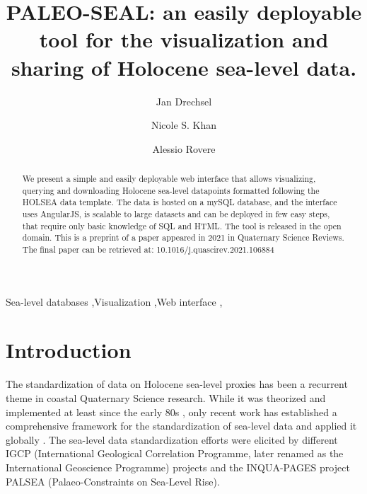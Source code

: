 \documentclass[a4paper,fleqn]{cas-dc}
\begin{document}
\let\WriteBookmarks\relax
\def\floatpagepagefraction{1}
\def\textpagefraction{.001}

\title [mode = title]{PALEO-SEAL: an easily deployable tool for the visualization and sharing of Holocene sea-level data.}                      

\author[1]{Jan Drechsel}
\address[1]{MARUM, Center for Marine Environmental Sciences, University of Bremen, Germany}

\author[2]{Nicole S. Khan}
\address[2]{Department of Earth Sciences and Swire Institute of Marine Science, University of Hong Kong, Hong Kong}

\author[1]{Alessio Rovere}
\cormark[1]

\begin{abstract}
We present a simple and easily deployable web interface that allows visualizing, querying and downloading Holocene sea-level datapoints formatted following the HOLSEA data template. The data is hosted on a mySQL database, and the interface uses AngularJS, is scalable to large datasets and can be deployed in few easy steps, that require only basic knowledge of SQL and HTML. The tool is released in the open domain. This is a preprint of a paper appeared in 2021 in Quaternary Science Reviews. The final paper can be retrieved at: 10.1016/j.quascirev.2021.106884

\end{abstract}

\begin{keywords}
Sea-level databases \sep Visualization \sep Web interface \sep 
\end{keywords}

\maketitle

\section{Introduction}
The standardization of data on Holocene sea-level proxies has been a recurrent theme in coastal Quaternary Science research. While it was theorized and implemented at least since the early 80s \citep{shennan1982,shennan1983,VanDePlassche1986}, only recent work has established a comprehensive framework for the standardization of sea-level data and applied it globally \citep{khan2019}. The sea-level data standardization efforts were elicited by different IGCP (International Geological Correlation Programme, later renamed as the International Geoscience Programme) projects and the INQUA-PAGES project PALSEA (Palaeo-Constraints on Sea-Level Rise). 
\end{document}
